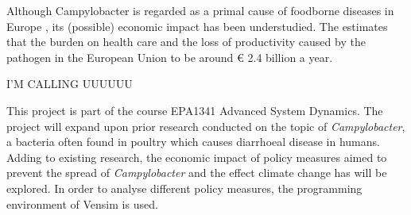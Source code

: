 \iffalse
1.	Establish field  -> Z
    a.	Societal relevance
2.	Outline problem in the field (Elias)
    a.	Scientific relevance
3.	Present solution to problem in the field
    a.	Problem statement/research question -> Z
    b.	Explain relevance of simulation method (Elias) considering the problem
4.	Reading guide -> Z

Target: 1000 words\
♫♪.ılılıll|̲̅̅●̲̅̅|̲̅̅=̲̅̅|̲̅̅●̲̅̅|llılılı.♫♪
\fi

Although Campylobacter is regarded as a primal cause of foodborne diseases in Europe \parencite{european_food_safety_authority_european_2019}
, its (possible) economic impact has been understudied. The \citeauthor{european_food_safety_authority_campylobacter_nodate} estimates that the burden on health care and the loss of productivity caused by the pathogen in the European Union to be around \euro{} 2.4 billion a year.  %

 I'M CALLING UUUUUU


This project is part of the course EPA1341 Advanced System Dynamics. The project will expand upon prior research conducted on the topic of \textit{Campylobacter}, a bacteria often found in poultry which causes diarrhoeal disease in humans. Adding to existing research, the economic impact of policy measures aimed to prevent the spread of  \textit{Campylobacter} and the effect climate change has will be explored. In order to analyse different policy measures, the programming environment of Vensim is used. 


